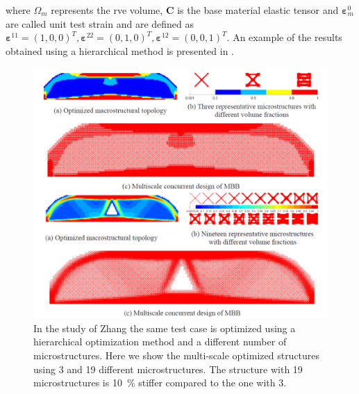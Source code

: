 where $\Omega_{m}$ represents the \gls{rve} volume, $\mathbf{C}$ is the base material elastic tensor and $\boldsymbol{\varepsilon}_{m}^{0}$ are called unit test strain and are defined as $\boldsymbol{\varepsilon}^{11}=(1,0,0)^{T}, \boldsymbol{\varepsilon}^{22}=(0,1,0)^{T}, \boldsymbol{\varepsilon}^{12}=(0,0,1)^{T}$. An example of the results obtained using a hierarchical method is presented in .
\begin{figure}
    \centering
    \includegraphics[width=0.9\linewidth]{figures/02_literature/top_multiscale.png}
    \caption{In the study of Zhang \etal \cite{zhang_multiscale_2018} the same test case is optimized using a hierarchical optimization method and a different number of microstructures. Here we show the multi-scale optimized structures using 3 and 19 different microstructures. The structure with 19 microstructures is \qty{10}{\percent} stiffer compared to the one with 3.}
    \label{fig:02_hierarchical}
\end{figure}

